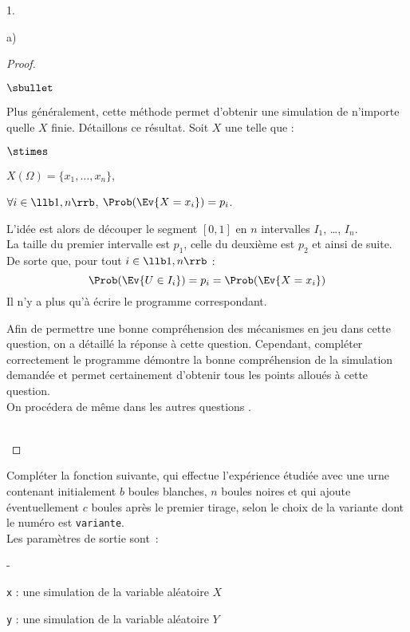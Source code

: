 \documentclass[11pt]{article}%
\begin{document}
\begin{noliste}{1.}
\begin{noliste}{a)}
\begin{proof}
\begin{remark}
\begin{noliste}{$\sbullet$}
      \item Plus généralement, cette méthode permet d'obtenir une
        simulation de n'importe quelle \var $X$ finie. Détaillons ce
        résultat. Soit $X$ une \var telle que :
        \begin{noliste}{$\stimes$}
        \item $X(\Omega) = \{ x_1, \ldots , x_n\}$,
        \item $\forall i \in \llb 1,n \rrb$, $\Prob(\Ev{X = x_i}) =
          p_i$.
        \end{noliste}
        L'idée est alors de découper le segment $[0, 1]$ en $n$
        intervalles $I_1$, \ldots, $I_n$.\\
        La taille du premier intervalle est $p_1$, celle du deuxième
        est $p_2$ et ainsi de suite.\\
        De sorte que, pour tout $i \in \llb 1, n \rrb$ :
        \[
        \Prob(\Ev{U \in I_i}) = p_i = \Prob(\Ev{X = x_i})
        \]
        Il n'y a plus qu'à écrire le programme correspondant.

      \item Afin de permettre une bonne compréhension des mécanismes
        en jeu dans cette question, on a détaillé la réponse à cette
        question. Cependant, compléter correctement le programme
        \Scilab{} démontre la bonne compréhension de la simulation
        demandée et permet certainement d'obtenir tous les points
        alloués à cette question.\\
        On procédera de même dans les autres questions \Scilab{}.
        \end{noliste}        
      \end{remark}~\\[-1.4cm]
    \end{proof}


    \newpage


  \item Compléter la fonction suivante, qui effectue l'expérience
    étudiée avec une urne contenant initialement $b$ boules blanches,
    $n$ boules noires et qui ajoute éventuellement $c$ boules après le
    premier tirage,
    selon le choix de la variante dont le numéro est \texttt{variante}.\\
    Les paramètres de sortie sont~:
    \begin{noliste}{-}
    \item \texttt{x} : une simulation de la variable aléatoire $X$
    \item \texttt{y} : une simulation de la variable aléatoire $Y$
    \end{noliste}


\end{noliste}
\end{noliste}
\end{document}
